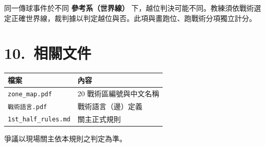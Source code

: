 \documentclass[11pt]{article}
\newcommand{\term}[1]{\textbf{#1}}
\begin{document}
同一傳球事件於不同 \term{參考系（世界線）} 下，越位判決可能不同。教練須依戰術選定正確世界線，裁判據以判定越位與否。此項與畫跑位、跑戰術分項獨立計分。

\section*{10.\ 相關文件}

\vspace{0.3em}
\begin{tabular}{@{}ll@{}}
\toprule
\textbf{檔案} & \textbf{內容} \\
\midrule
\texttt{zone\_map.pdf} & 20 戰術區編號與中文名稱 \\
\texttt{戰術語言.pdf} & 戰術語言（邊）定義 \\
\texttt{1st\_half\_rules.md} & 關主正式規則 \\
\bottomrule
\end{tabular}

\vspace{1em}
\noindent
爭議以現場關主依本規則之判定為準。
\end{document}
